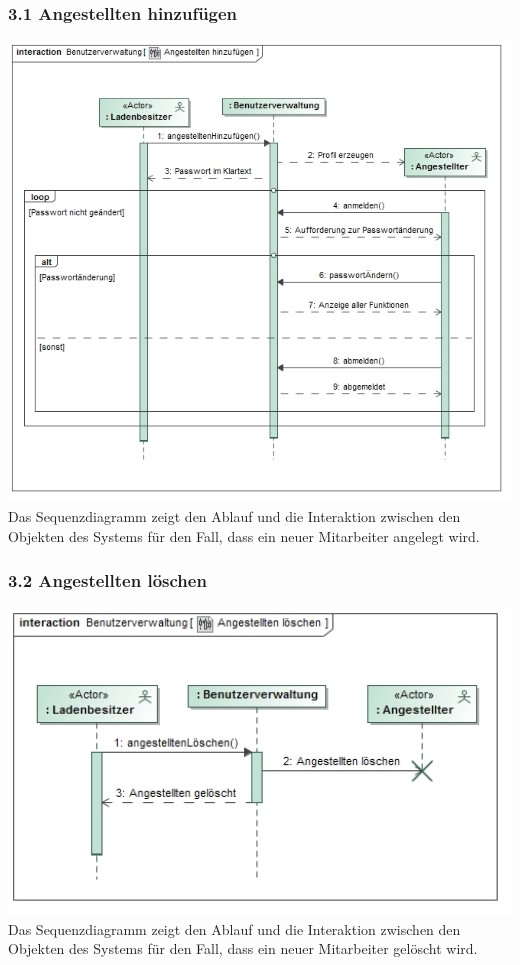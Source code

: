 \documentclass[pdftex,12pt,a4paper]{article}
\begin{document}
\subsubsection*{3.1 Angestellten hinzuf\"ugen}
\includegraphics[width=1\textwidth]{./images/angestelltenhinzufuegen}
Das Sequenzdiagramm zeigt den Ablauf und die Interaktion zwischen den Objekten des Systems f\"ur den Fall, dass ein neuer Mitarbeiter angelegt wird.
\subsubsection*{3.2 Angestellten l\"oschen}
\includegraphics[width=1\textwidth]{./images/angestelltenloeschen}
Das Sequenzdiagramm zeigt den Ablauf und die Interaktion zwischen den Objekten des Systems f\"ur den Fall, dass ein neuer Mitarbeiter gel\"oscht wird.
\end{document}
